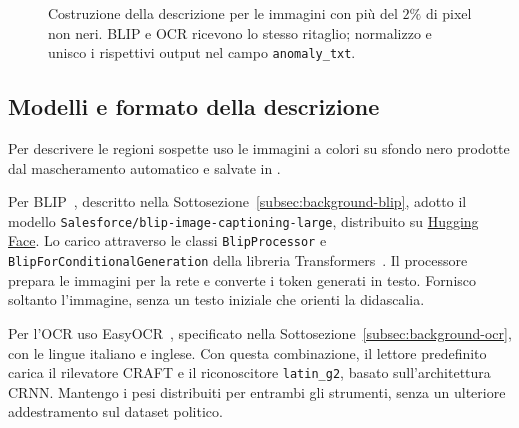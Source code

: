 \begin{figure}[htbp]
    \centering
    \caption{Costruzione della descrizione per le immagini con più del $2\%$ di pixel non neri. BLIP e OCR ricevono lo stesso ritaglio; normalizzo e unisco i rispettivi output nel campo \texttt{anomaly\_txt}.}
    \label{fig:descrizione-flusso}
\end{figure}

\subsection{Modelli e formato della descrizione}
\label{subsec:materiali-descrizioni}

Per descrivere le regioni sospette uso le immagini a colori su sfondo nero prodotte dal mascheramento automatico e salvate in .

Per BLIP~\cite{pmlr-v162-li22n}, descritto nella Sottosezione~\ref{subsec:background-blip}, adotto il modello \texttt{Salesforce/blip-image-captioning-large}, distribuito su \href{https://huggingface.co/Salesforce/blip-image-captioning-large}{Hugging Face}. Lo carico attraverso le classi \texttt{BlipProcessor} e \texttt{BlipForConditionalGeneration} della libreria Transformers~\cite{wolf-etal-2020-transformers}. Il processore prepara le immagini per la rete e converte i token generati in testo. Fornisco soltanto l'immagine, senza un testo iniziale che orienti la didascalia.

Per l'OCR uso EasyOCR~\cite{easyocr_software}, specificato nella Sottosezione~\ref{subsec:background-ocr}, con le lingue italiano e inglese. Con questa combinazione, il lettore predefinito carica il rilevatore CRAFT e il riconoscitore \texttt{latin\_g2}, basato sull'architettura CRNN. Mantengo i pesi distribuiti per entrambi gli strumenti, senza un ulteriore addestramento sul dataset politico.

